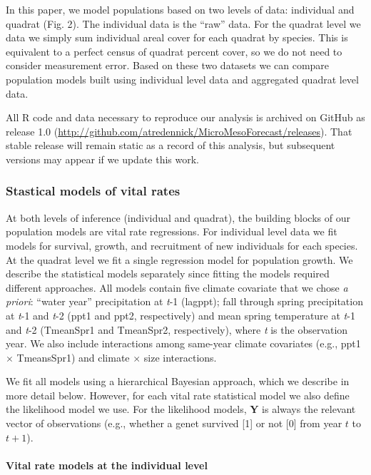 \documentclass[12pt,]{article}
\begin{document}
In this paper, we model populations based on two levels of data:
individual and quadrat (Fig. 2). The individual data is the ``raw''
data. For the quadrat level we data we simply sum individual areal cover
for each quadrat by species. This is equivalent to a perfect census of
quadrat percent cover, so we do not need to consider measurement error.
Based on these two datasets we can compare population models built using
individual level data and aggregated quadrat level data.

All R code and data necessary to reproduce our analysis is archived on
GitHub as release 1.0
(\url{http://github.com/atredennick/MicroMesoForecast/releases}). That
stable release will remain static as a record of this analysis, but
subsequent versions may appear if we update this work.

\subsubsection{Stastical models of vital
rates}\label{stastical-models-of-vital-rates}

At both levels of inference (individual and quadrat), the building
blocks of our population models are vital rate regressions. For
individual level data we fit models for survival, growth, and
recruitment of new individuals for each species. At the quadrat level we
fit a single regression model for population growth. We describe the
statistical models separately since fitting the models required
different approaches. All models contain five climate covariate that we
chose \emph{a priori}: ``water year'' precipitation at \emph{t}-1
(lagppt); fall through spring precipitation at \emph{t}-1 and \emph{t}-2
(ppt1 and ppt2, respectively) and mean spring temperature at \emph{t}-1
and \emph{t}-2 (TmeanSpr1 and TmeanSpr2, respectively), where \emph{t}
is the observation year. We also include interactions among same-year
climate covariates (e.g., ppt1 $\times$ TmeansSpr1) and climate $\times$
size interactions.

We fit all models using a hierarchical Bayesian approach, which we
describe in more detail below. However, for each vital rate statistical
model we also define the likelihood model we use. For the likelihood
models, \textbf{Y} is always the relevant vector of observations (e.g.,
whether a genet survived {[}1{]} or not {[}0{]} from year $t$ to $t+1$).

\paragraph{Vital rate models at the individual
level}\label{vital-rate-models-at-the-individual-level}
\end{document}
